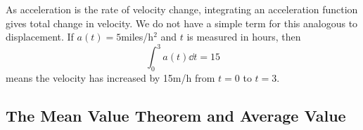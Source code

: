
As acceleration is the rate of velocity change, integrating an acceleration function gives total change in velocity. We do not have a simple term for this analogous to displacement. If $a(t) = 5$miles/h$^2$ and $t$ is measured in hours, then 
\[\int_0^3 a(t)\dd t = 15\]
means the velocity has increased by 15m/h from $t=0$ to $t=3$.

\subsection{The Mean Value Theorem and Average Value}

